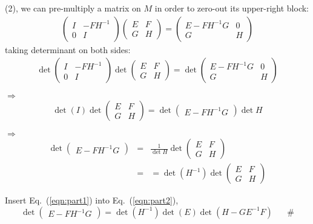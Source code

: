 \documentclass{article}
\begin{document}
(2), we can pre-multiply a matrix on $M$ in order to zero-out its upper-right block:
\begin{eqnarray*}
\begin{pmatrix} I & -FH^{-1} \\ 0 & I \end{pmatrix} \begin{pmatrix} E & F \\ G & H \end{pmatrix} = \begin{pmatrix} E - FH^{-1} G & 0 \\ G & H \end{pmatrix}
\end{eqnarray*}
taking determinant on both sides:
\begin{eqnarray*}
\det{\begin{pmatrix} I & -FH^{-1} \\ 0 & I \end{pmatrix}} \det{\begin{pmatrix} E & F \\ G & H \end{pmatrix} } = \det{\begin{pmatrix} E - FH^{-1} G & 0 \\ G & H \end{pmatrix}}
\end{eqnarray*}

$\Rightarrow$
\begin{eqnarray*}
\det{(I)} \det{\begin{pmatrix} E & F \\ G & H \end{pmatrix}} = \det{ \begin{pmatrix} E - FH^{-1} G \end{pmatrix} \det{H} }
\end{eqnarray*}

$\Rightarrow$
\begin{eqnarray}
\det{ \begin{pmatrix} E - FH^{-1} G \end{pmatrix} } &=& \frac{1}{\det{H}} \det{\begin{pmatrix} E & F \\ G & H \end{pmatrix}} \nonumber \\
&=& = \det{(H^{-1})} \det{\begin{pmatrix} E & F \\ G & H \end{pmatrix}}
\label{eqn:part2}
\end{eqnarray}

Insert Eq.~(\ref{eqn:part1}) into Eq.~(\ref{eqn:part2}), 
\begin{equation}
\det{ \begin{pmatrix} E - FH^{-1} G \end{pmatrix} } = \det{(H^{-1})} \det{(E)} \det{(H - G E^{-1} F)} \hspace{20pt} \#
\end{equation}
\end{document}
